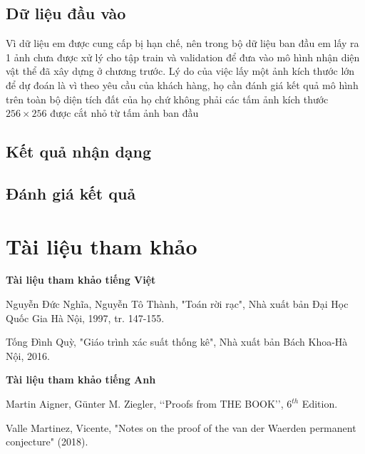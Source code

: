 \documentclass[a4paper, 12pt]{report}
\begin{document}
\section{Dữ liệu đầu vào}
Vì dữ liệu em được cung cấp bị hạn chế, nên trong bộ dữ liệu ban đầu em lấy ra 1 ảnh chưa được xử lý cho tập train và validation để đưa vào mô hình nhận diện vật thể đã xây dựng ở chương trước.  Lý do của việc lấy một ảnh kích thước lớn để dự đoán là vì theo yêu cầu của khách hàng,  họ cần đánh giá kết quả mô hình trên toàn bộ diện tích đất của họ chứ không phải các tấm ảnh kích thước $256 \times 256$ được cắt nhỏ từ tấm ảnh ban đầu

\section{Kết quả nhận dạng}

\section{Đánh giá kết quả}

\chapter*{Tài liệu tham khảo}
\mdseries 
\textbf{Tài liệu tham khảo tiếng Việt}

\begin{enumerate}[label=\textrm{[\arabic*.]}]
\item Nguyễn Đức Nghĩa, Nguyễn Tô Thành, "Toán rời rạc", Nhà xuất bản Đại Học Quốc Gia Hà Nội, 1997, tr. 147-155.
\item Tống Đình Quỳ, "Giáo trình xác suất thống kê", Nhà xuất bản Bách Khoa-Hà Nội, 2016.
\end{enumerate}
 \textbf{Tài liệu tham khảo tiếng Anh}
\begin{enumerate}[label=\textrm{[\arabic*.]}]
\item
	Martin Aigner, Günter M. Ziegler, ‘‘Proofs from THE BOOK’’, $6^{th}$ Edition.
\item
	Valle Martinez, Vicente, "Notes on the proof of the van der Waerden permanent conjecture" (2018).
\end{enumerate}
\end{document}
